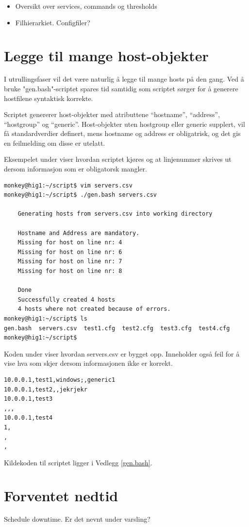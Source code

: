 \begin{itemize}
        \item Oversikt over services, commands og thresholds
        \item Filhierarkiet. Configfiler?
\end{itemize}
\section{Legge til mange host-objekter}
I utrullingsfaser vil det være naturlig å legge til mange hosts på den gang. Ved å bruke "gen.bash"-scriptet spares tid samtidig som scriptet sørger for å generere hostfilene syntaktisk korrekte.

Scriptet genererer host-objekter med atributtene  ``hostname'', ``address'', ``hostgroup'' og ``generic''. Host-objekter uten hostgroup eller generic supplert, vil få standardverdier definert, mens hostname og address er obligatrisk, og det gis en feilmelding om disse er utelatt.

Eksempelet under viser hvordan scriptet kjøres og at linjenummer skrives ut dersom informasjon som er obligatorsk mangler.
\begin{lstlisting}
monkey@hig1:~/script$ vim servers.csv
monkey@hig1:~/script$ ./gen.bash servers.csv

	Generating hosts from servers.csv into working directory

	Hostname and Address are mandatory.
	Missing for host on line nr: 4
	Missing for host on line nr: 6
	Missing for host on line nr: 7
	Missing for host on line nr: 8

	Done
	Successfully created 4 hosts
	4 hosts where not created because of errors.
monkey@hig1:~/script$ ls
gen.bash  servers.csv  test1.cfg  test2.cfg  test3.cfg  test4.cfg
monkey@hig1:~/script$
\end{lstlisting}

Koden under viser hvordan servers.csv er bygget opp. Inneholder også feil for å vise hva som skjer dersom informasjonen ikke er korrekt.
\begin{lstlisting}
10.0.0.1,test1,windows;,generic1
10.0.0.1,test2,,jekrjekr
10.0.0.1,test3
,,,
10.0.0.1,test4
1,
,
,
\end{lstlisting}

Kildekoden til scriptet ligger i Vedlegg \ref{gen.bash}.

\section{Forventet nedtid}
Schedule downtime. Er det nevnt under varsling?
